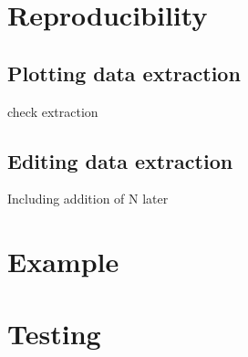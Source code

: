 \documentclass{article}
\begin{document}




\section{Reproducibility}

\subsection{Plotting data extraction}
check extraction

\subsection{Editing data extraction}
Including addition of N later


\section{Example}


\section{Testing}
\end{document}
